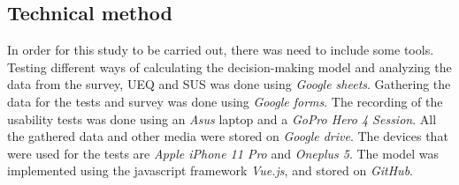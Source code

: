 \subsection{Technical method}

In order for this study to be carried out, there was need to include some tools. Testing different ways of calculating the decision-making model and analyzing the data from the survey, UEQ and SUS was done using \textit{Google sheets}. Gathering the data for the tests and survey was done using \textit{Google forms}. The recording of the usability tests was done using an \textit{Asus} laptop and a \textit{GoPro Hero 4 Session}. All the gathered data and other media were stored on \textit{Google drive}. The devices that were used for the tests are \textit{Apple iPhone 11 Pro} and \textit{Oneplus 5}. The model was implemented using the javascript framework  \textit{Vue.js}, and stored on \textit{GitHub}.  